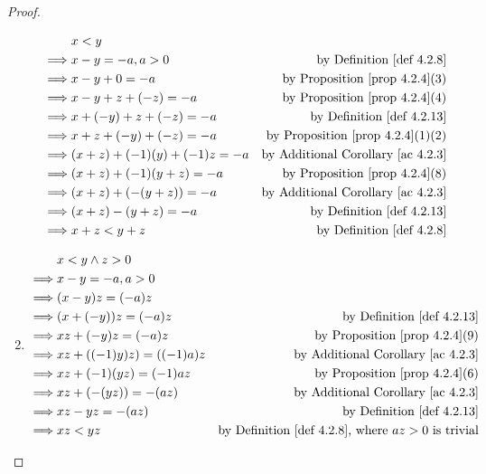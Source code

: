 \begin{proof}
\begin{enumerate}
        \begin{align*}
                     & x < y \\
            \implies & x - y = -a, a > 0 & \text{by \DEF{4.2.8}} \\
            \implies & x - y + 0 = -a & \text{by \PROP{4.2.4}(3)} \\
            \implies & x - y + z + (-z) = -a & \text{by \PROP{4.2.4}(4)} \\
            \implies & x + (-y) + z + (-z) = -a & \text{by \DEF{4.2.13}} \\
            \implies & x + z + (-y) + (-z) = -a & \text{by \PROP{4.2.4}(1)(2)} \\
            \implies & (x + z) + (-1)(y) + (-1)z = -a & \text{by \AC{4.2.3}} \\
            \implies & (x + z) + (-1)(y + z) = -a & \text{by \PROP{4.2.4}(8)} \\
            \implies & (x + z) + (-(y + z)) = -a & \text{by \AC{4.2.3}} \\
            \implies & (x + z) - (y + z) = -a & \text{by \DEF{4.2.13}} \\
            \implies & x + z < y + z & \text{by \DEF{4.2.8}}
        \end{align*}
    \item {}
        \begin{align*}
                     & x < y \land z > 0 \\
            \implies & x - y = -a, a > 0 \\
            \implies & (x - y)z = (-a)z \\
            \implies & (x + (-y))z = (-a)z & \text{by \DEF{4.2.13}} \\
            \implies & xz + (-y)z = (-a)z & \text{by \PROP{4.2.4}(9)} \\
            \implies & xz + ((-1)y)z) = ((-1)a)z & \text{by \AC{4.2.3}} \\
            \implies & xz + (-1)(yz) = (-1)az & \text{by \PROP{4.2.4}(6)} \\
            \implies & xz + (-(yz)) = -(az) & \text{by \AC{4.2.3}} \\
            \implies & xz - yz = -(az) & \text{by \DEF{4.2.13}} \\
            \implies & xz < yz & \text{by \DEF{4.2.8}, where \(az > 0\) is trivial}
        \end{align*}
\end{enumerate}
\end{proof}

